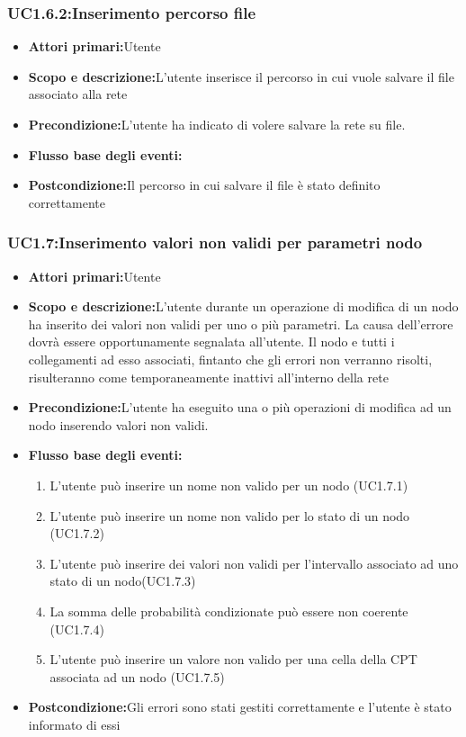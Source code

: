 \subsubsection{UC1.6.2:Inserimento percorso file}
\begin{itemize}
	\item{\textbf{Attori primari:}Utente}
	\item{\textbf{Scopo e descrizione:}L'utente inserisce il percorso in cui vuole salvare il file associato alla rete}
	\item{\textbf{Precondizione:}L'utente ha indicato di volere salvare la rete su file.}
	\item{\textbf{Flusso base degli eventi:}}
	\item{\textbf{Postcondizione:}Il percorso in cui salvare il file è stato definito correttamente}
\end{itemize}
\subsubsection{UC1.7:Inserimento valori non validi per parametri nodo}
\begin{itemize}
	\item{\textbf{Attori primari:}Utente}
	\item{\textbf{Scopo e descrizione:}L'utente durante un operazione di modifica di un nodo ha inserito dei valori non validi per uno o più parametri. La causa dell'errore dovrà essere opportunamente segnalata all'utente. Il nodo e tutti i collegamenti ad esso associati, fintanto che gli errori non verranno risolti, risulteranno come temporaneamente inattivi all'interno della rete}
	\item{\textbf{Precondizione:}L'utente ha eseguito una o più operazioni di modifica ad un nodo inserendo valori non validi.}
	\item{\textbf{Flusso base degli eventi:}}
	\begin{enumerate}
	\item{L'utente può inserire un nome non valido per un nodo (UC1.7.1)}
	\item{L'utente può inserire un nome non valido per lo stato di un nodo (UC1.7.2)}
	\item{L'utente può inserire dei valori non validi per l'intervallo associato ad uno stato di un nodo(UC1.7.3)}
	\item{La somma delle probabilità condizionate può essere non coerente (UC1.7.4)}
	\item{L'utente può inserire un valore non valido per una cella della CPT associata ad un nodo (UC1.7.5)}
	\end{enumerate}
	\item{\textbf{Postcondizione:}Gli errori sono stati gestiti correttamente e l'utente è stato informato di essi}
\end{itemize}
